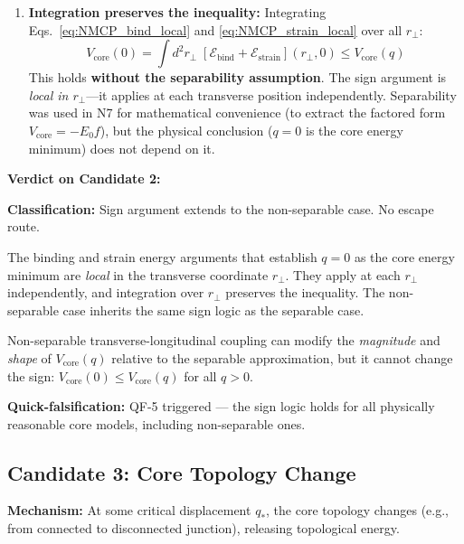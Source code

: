 \begin{enumerate}
    \item \textbf{Integration preserves the inequality:}
          Integrating Eqs.~\eqref{eq:NMCP_bind_local} and
          \eqref{eq:NMCP_strain_local} over all $r_\perp$:
          \begin{equation}
              V_{\mathrm{core}}(0) = \int d^2 r_\perp\;
              [\mathcal{E}_{\mathrm{bind}} + \mathcal{E}_{\mathrm{strain}}]
              (r_\perp, 0)
              \leq V_{\mathrm{core}}(q)
              \label{eq:NMCP_nonsep_sign}
          \end{equation}
          This holds \textbf{without the separability assumption}. The
          sign argument is \emph{local in $r_\perp$}---it applies at each
          transverse position independently. Separability was used in N7
          for mathematical convenience (to extract the factored form
          $V_{\mathrm{core}} = -E_0 f$), but the physical conclusion
          ($q = 0$ is the core energy minimum) does not depend on it.
\end{enumerate}

\textbf{Verdict on Candidate 2:}
\begin{resultbox}[title=Candidate 2: Non-Separable Coupling]
\textbf{Classification:} Sign argument extends to the non-separable
case. No escape route.

The binding and strain energy arguments that establish $q = 0$ as the
core energy minimum are \emph{local} in the transverse coordinate
$r_\perp$. They apply at each $r_\perp$ independently, and integration
over $r_\perp$ preserves the inequality. The non-separable case
inherits the same sign logic as the separable case.

Non-separable transverse-longitudinal coupling can modify the
\emph{magnitude} and \emph{shape} of $V_{\mathrm{core}}(q)$ relative
to the separable approximation, but it cannot change the sign:
$V_{\mathrm{core}}(0) \leq V_{\mathrm{core}}(q)$ for all $q > 0$.

\textbf{Quick-falsification:} QF-5 triggered --- the sign logic holds
for all physically reasonable core models, including non-separable ones.
\tagDc
\end{resultbox}

\subsection{Candidate 3: Core Topology Change}

\textbf{Mechanism:} At some critical displacement $q_*$, the core
topology changes (e.g., from connected to disconnected junction),
releasing topological energy.


